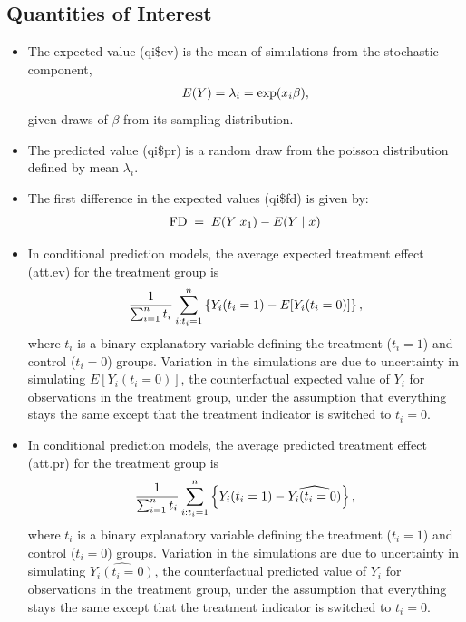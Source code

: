 \documentclass[letterpaper,10pt,english]{sphinxmanual}
\begin{document}
\subsection{Quantities of Interest}
\label{vignette:id43}\begin{itemize}
\item {} 
The expected value (qi\$ev) is the mean of simulations from the
stochastic component,
\begin{gather}
\begin{split}E(Y) = \lambda_i =  \exp(x_i
  \beta),\end{split}\notag
\end{gather}
given draws of \(\beta\) from its sampling distribution.

\item {} 
The predicted value (qi\$pr) is a random draw from the poisson
distribution defined by mean \(\lambda_i\).

\item {} 
The first difference in the expected values (qi\$fd) is given by:
\begin{gather}
\begin{split}\textrm{FD} \; = \; E(Y | x_1) - E(Y \mid x)\end{split}\notag
\end{gather}
\item {} 
In conditional prediction models, the average expected treatment
effect (att.ev) for the treatment group is
\begin{gather}
\begin{split}\frac{1}{\sum_{i=1}^n t_i}\sum_{i:t_i=1}^n \left\{ Y_i(t_i=1) -
      E[Y_i(t_i=0)] \right\},\end{split}\notag
\end{gather}
where \(t_i\) is a binary explanatory variable defining the
treatment (\(t_i=1\)) and control (\(t_i=0\)) groups.
Variation in the simulations are due to uncertainty in simulating
\(E[Y_i(t_i=0)]\), the counterfactual expected value of
\(Y_i\) for observations in the treatment group, under the
assumption that everything stays the same except that the treatment
indicator is switched to \(t_i=0\).

\item {} 
In conditional prediction models, the average predicted treatment
effect (att.pr) for the treatment group is
\begin{gather}
\begin{split}\frac{1}{\sum_{i=1}^n t_i}\sum_{i:t_i=1}^n \left\{ Y_i(t_i=1) -
      \widehat{Y_i(t_i=0)} \right\},\end{split}\notag
\end{gather}
where \(t_i\) is a binary explanatory variable defining the
treatment (\(t_i=1\)) and control (\(t_i=0\)) groups.
Variation in the simulations are due to uncertainty in simulating
\(\widehat{Y_i(t_i=0)}\), the counterfactual predicted value of
\(Y_i\) for observations in the treatment group, under the
assumption that everything stays the same except that the treatment
indicator is switched to \(t_i=0\).

\end{itemize}
\end{document}
